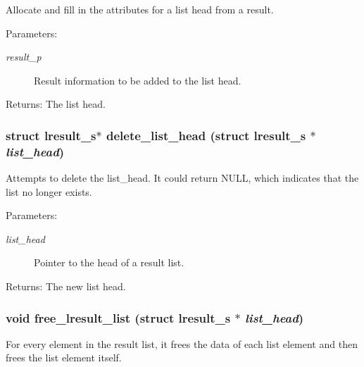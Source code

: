Allocate and fill in the attributes for a list head from a result.

\begin{Desc}
\item[Parameters:]
\begin{description}
\item[{\em result\_\-p}]Result information to be added to the list head. \end{description}
\end{Desc}
\begin{Desc}
\item[Returns:]The list head. \end{Desc}
\subsubsection{\setlength{\rightskip}{0pt plus 5cm}struct \bf{lresult\_\-s}$\ast$ delete\_\-list\_\-head (struct \bf{lresult\_\-s} $\ast$ {\em list\_\-head})}\label{llist_8c_6010ebe958b187cb14f5ce102ecdaf59}


Attempts to delete the list\_\-head. It could return NULL, which indicates that the list no longer exists.

\begin{Desc}
\item[Parameters:]
\begin{description}
\item[{\em list\_\-head}]Pointer to the head of a result list. \end{description}
\end{Desc}
\begin{Desc}
\item[Returns:]The new list head. \end{Desc}
\subsubsection{\setlength{\rightskip}{0pt plus 5cm}void free\_\-lresult\_\-list (struct \bf{lresult\_\-s} $\ast$ {\em list\_\-head})}\label{llist_8c_9ccdd6220d51b5f2de19c0b94cd13223}


For every element in the result list, it frees the data of each list element and then frees the list element itself.

